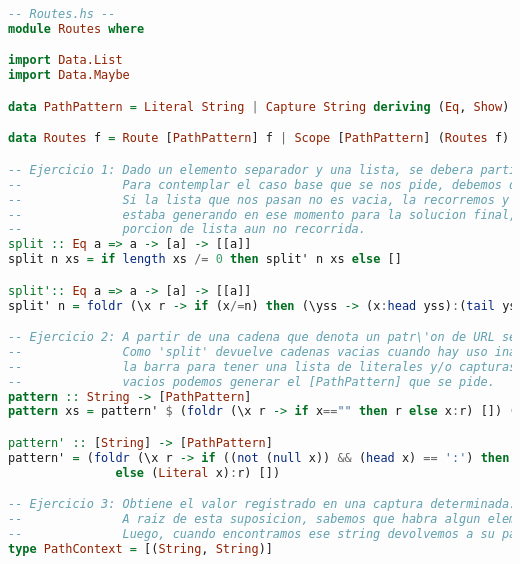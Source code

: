\documentclass[10pt,a4paper]{article}
\begin{document}
\begin{lstlisting}[language=Haskell,breaklines=true,basicstyle=\tiny]
-- Routes.hs --
module Routes where

import Data.List
import Data.Maybe

data PathPattern = Literal String | Capture String deriving (Eq, Show)

data Routes f = Route [PathPattern] f | Scope [PathPattern] (Routes f) | Many [Routes f] deriving Show

-- Ejercicio 1: Dado un elemento separador y una lista, se debera partir la lista en sublistas de acuerdo a la aparici\'on del separador (sin incluirlo).
--              Para contemplar el caso base que se nos pide, debemos devolver [] si nos pasan la lista vacia.
--              Si la lista que nos pasan no es vacia, la recorremos y cada vez que aparece un elemento igual al que nos pasan, agrego la sublista que
--              estaba generando en ese momento para la solucion final, y el resto de las sublistas las voy a agregar recursivamente a partir de la
--              porcion de lista aun no recorrida.
split :: Eq a => a -> [a] -> [[a]]
split n xs = if length xs /= 0 then split' n xs else []

split':: Eq a => a -> [a] -> [[a]]
split' n = foldr (\x r -> if (x/=n) then (\yss -> (x:head yss):(tail yss)) r else [[]] ++ r) [[]]

-- Ejercicio 2: A partir de una cadena que denota un patr\'on de URL se deber\'a construir la secuencia de literales y capturas correspondiente.
--              Como 'split' devuelve cadenas vacias cuando hay uso inadecuado de las barras "//", procesamos la particion del string a partir de 
--              la barra para tener una lista de literales y/o capturas representados de forma aceptable. A partir de esta lista de strings no
--              vacios podemos generar el [PathPattern] que se pide.
pattern :: String -> [PathPattern]
pattern xs = pattern' $ (foldr (\x r -> if x=="" then r else x:r) []) (split '/' xs)

pattern' :: [String] -> [PathPattern]
pattern' = (foldr (\x r -> if ((not (null x)) && (head x) == ':') then (Capture (tail x)):r 
               else (Literal x):r) [])

-- Ejercicio 3: Obtiene el valor registrado en una captura determinada. Se puede suponer que la captura est\'a definida en el contexto.
--              A raiz de esta suposicion, sabemos que habra algun elemento del PathContext que se corresponda con el string que nos pasan.
--              Luego, cuando encontramos ese string devolvemos a su pareja.
type PathContext = [(String, String)]


\end{lstlisting}
\end{document}
